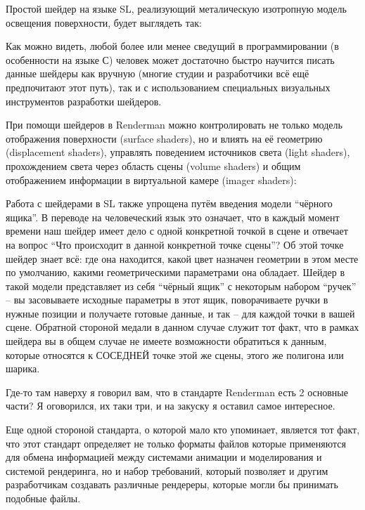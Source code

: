  Простой шейдер на языке SL, реализующий
    металическую изотропную модель освещения поверхности, будет
    выглядеть так:
  

 Как можно видеть, любой более или менее сведущий в
    программировании (в особенности на языке С) человек может
    достаточно быстро научится писать данные шейдеры как вручную
    (многие студии и разработчики всё ещё предпочитают этот путь), так
    и с использованием специальных визуальных инструментов разработки
    шейдеров.
  

 При помощи шейдеров в Renderman можно
    контролировать не только модель отображения поверхности
    (surface shaders), но и влиять на её геометрию (displacement shaders),
    управлять поведением источников света (light  shaders),
    прохождением света через область сцены (volume shaders) и общим
    отображением информации в виртуальной камере (imager shaders):
  

  

 Работа с шейдерами в SL также упрощена
    путём введения модели “чёрного ящика”. В переводе на человеческий
    язык это означает, что в каждый момент времени наш шейдер имеет
    дело с одной конкретной точкой в сцене и отвечает на вопрос “Что
    происходит в данной конкретной точке сцены”? Об этой точке шейдер
    знает всё: где она находится, какой цвет назначен геометрии в этом
    месте по умолчанию, какими геометрическими параметрами она
    обладает. Шейдер в такой модели представляет из себя “чёрный ящик”
    с некоторым набором “ручек” – вы засовываете исходные параметры в
    этот ящик, поворачиваете ручки в нужные позиции и получаете готовые
    данные, и так – для каждой точки в вашей сцене. Обратной стороной
    медали в данном случае служит тот факт, что в рамках шейдера вы в
    общем случае не имеете возможности обратиться к данным, которые
    относятся к СОСЕДНЕЙ точке этой же сцены, этого же полигона или
    шарика.
  

 Где-то там наверху я говорил вам, что в
    стандарте Renderman есть 2
    основные части? Я оговорился, их таки три, и на закуску я оставил
    самое интересное.
  

 Еще одной стороной стандарта, о которой мало кто
    упоминает,  является
    тот факт, что этот стандарт определяет не только форматы файлов
    которые применяются для обмена информацией между системами анимации
    и моделирования и  системой рендеринга, но и набор требований, который позволяет и
    другим разработчикам создавать различные рендереры, которые могли
    бы принимать подобные файлы.
  

